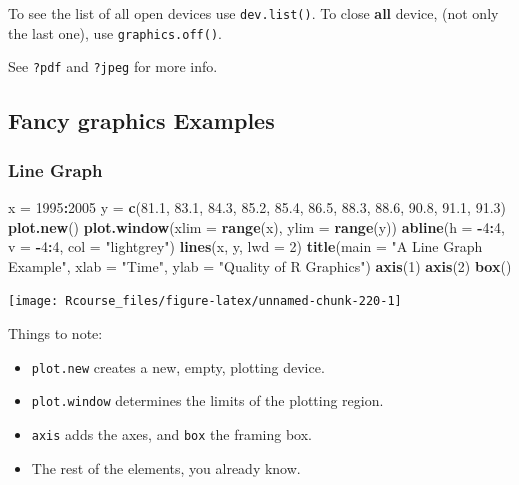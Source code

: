 \documentclass[]{book}
\newenvironment{Shaded}{\begin{snugshade}}{\end{snugshade}}
\newcommand{\KeywordTok}[1]{\textcolor[rgb]{0.13,0.29,0.53}{\textbf{#1}}}
\newcommand{\DataTypeTok}[1]{\textcolor[rgb]{0.13,0.29,0.53}{#1}}
\newcommand{\DecValTok}[1]{\textcolor[rgb]{0.00,0.00,0.81}{#1}}
\newcommand{\FloatTok}[1]{\textcolor[rgb]{0.00,0.00,0.81}{#1}}
\newcommand{\StringTok}[1]{\textcolor[rgb]{0.31,0.60,0.02}{#1}}
\newcommand{\OperatorTok}[1]{\textcolor[rgb]{0.81,0.36,0.00}{\textbf{#1}}}
\newcommand{\NormalTok}[1]{#1}
\providecommand{\tightlist}{%
  \setlength{\itemsep}{0pt}\setlength{\parskip}{0pt}}
\theoremstyle{definition}
\theoremstyle{definition}
\theoremstyle{definition}
\theoremstyle{remark}
\begin{document}
To see the list of all open devices use \texttt{dev.list()}. To close
\textbf{all} device, (not only the last one), use
\texttt{graphics.off()}.

See \texttt{?pdf} and \texttt{?jpeg} for more info.

\subsection{Fancy graphics Examples}\label{fancy}

\subsubsection{Line Graph}\label{line-graph}

\begin{Shaded}
\begin{Highlighting}[]
\NormalTok{x =}\StringTok{ }\DecValTok{1995}\OperatorTok{:}\DecValTok{2005}
\NormalTok{y =}\StringTok{ }\KeywordTok{c}\NormalTok{(}\FloatTok{81.1}\NormalTok{, }\FloatTok{83.1}\NormalTok{, }\FloatTok{84.3}\NormalTok{, }\FloatTok{85.2}\NormalTok{, }\FloatTok{85.4}\NormalTok{, }\FloatTok{86.5}\NormalTok{, }\FloatTok{88.3}\NormalTok{, }\FloatTok{88.6}\NormalTok{, }\FloatTok{90.8}\NormalTok{, }\FloatTok{91.1}\NormalTok{, }\FloatTok{91.3}\NormalTok{)}
\KeywordTok{plot.new}\NormalTok{()}
\KeywordTok{plot.window}\NormalTok{(}\DataTypeTok{xlim =} \KeywordTok{range}\NormalTok{(x), }\DataTypeTok{ylim =} \KeywordTok{range}\NormalTok{(y))}
\KeywordTok{abline}\NormalTok{(}\DataTypeTok{h =} \OperatorTok{-}\DecValTok{4}\OperatorTok{:}\DecValTok{4}\NormalTok{, }\DataTypeTok{v =} \OperatorTok{-}\DecValTok{4}\OperatorTok{:}\DecValTok{4}\NormalTok{, }\DataTypeTok{col =} \StringTok{"lightgrey"}\NormalTok{)}
\KeywordTok{lines}\NormalTok{(x, y, }\DataTypeTok{lwd =} \DecValTok{2}\NormalTok{)}
\KeywordTok{title}\NormalTok{(}\DataTypeTok{main =} \StringTok{"A Line Graph Example"}\NormalTok{,}
        \DataTypeTok{xlab =} \StringTok{"Time"}\NormalTok{,}
        \DataTypeTok{ylab =} \StringTok{"Quality of R Graphics"}\NormalTok{)}
\KeywordTok{axis}\NormalTok{(}\DecValTok{1}\NormalTok{)}
\KeywordTok{axis}\NormalTok{(}\DecValTok{2}\NormalTok{)}
\KeywordTok{box}\NormalTok{()}
\end{Highlighting}
\end{Shaded}

\texttt{[image: Rcourse\_files/figure-latex/unnamed-chunk-220-1]}

Things to note:

\begin{itemize}
\tightlist
\item
  \texttt{plot.new} creates a new, empty, plotting device.
\item
  \texttt{plot.window} determines the limits of the plotting region.
\item
  \texttt{axis} adds the axes, and \texttt{box} the framing box.
\item
  The rest of the elements, you already know.
\end{itemize}
\end{document}
